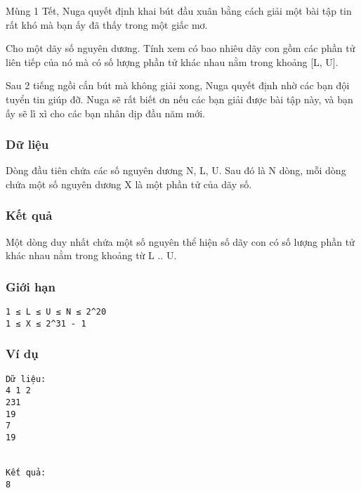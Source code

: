 



   Mùng 1 Tết, Nuga quyết định khai bút đầu xuân bằng cách giải một bài tập tin rất khó mà bạn ấy đã thấy trong một giấc mơ.  

   Cho một dãy số nguyên dương. Tính xem có bao nhiêu dãy con gồm các phần tử liên tiếp của nó mà có số lượng phần tử khác nhau nằm trong khoảng [L, U].  

   Sau 2 tiếng ngồi cắn bút mà không giải xong, Nuga quyết định nhờ các bạn đội tuyển tin giúp đỡ. Nuga sẽ rất biết ơn nếu các bạn giải được bài tập này, và bạn ấy sẽ lì xì cho các bạn nhân dịp đầu năm mới.  

\subsubsection{   Dữ liệu  }

   Dòng đầu tiên chứa các số nguyên dương N, L, U. Sau đó là N dòng, mỗi dòng chứa một số nguyên dương X là một phần tử của dãy số.  

\subsubsection{   Kết quả  }

   Một dòng duy nhất chứa một số nguyên thể hiện số dãy con có số lượng phần tử khác nhau nằm trong khoảng từ L .. U.  

\subsubsection{   Giới hạn  }


\begin{verbatim}
1 ≤ L ≤ U ≤ N ≤ 2^20
1 ≤ X ≤ 2^31 - 1
\end{verbatim}



\subsubsection{   Ví dụ  }
\begin{verbatim}
Dữ liệu:
4 1 2
231
19
7
19


Kết quả:
8
\end{verbatim}